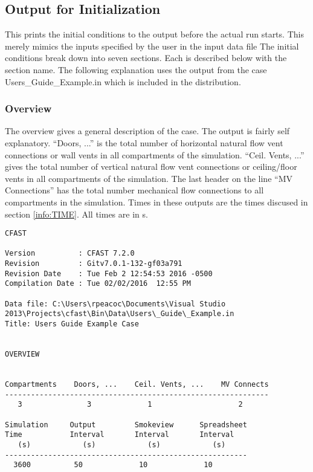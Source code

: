 \subsection{Output for Initialization}

This prints the initial conditions to the output before the actual run starts.  This merely mimics the inputs specified by the user in the input data file  The initial conditions break down into seven sections.  Each is described below with the section name. The following explanation uses the output from the case {\ct Users\_Guide\_Example.in} which is included in the distribution.

\subsubsection{Overview}

The overview gives a general description of the case.  The output is fairly self explanatory. ``Doors, ...'' is the total number of horizontal natural flow vent connections or wall vents in all compartments of the simulation.  ``Ceil. Vents, ...'' gives the total number of vertical natural flow vent connections or ceiling/floor vents in all compartments of the simulation.  The last header on the line ``MV Connections'' has the total number mechanical flow connections to all compartments in the simulation. Times in these outputs are the times discused in section \ref{info:TIME}. All times are in s.
\begin{lstlisting}[basicstyle=\tiny]
CFAST

Version          : CFAST 7.2.0
Revision         : Gitv7.0.1-132-gf03a791
Revision Date    : Tue Feb 2 12:54:53 2016 -0500
Compilation Date : Tue 02/02/2016  12:55 PM

Data file: C:\Users\rpeacoc\Documents\Visual Studio 2013\Projects\cfast\Bin\Data\Users\_Guide\_Example.in
Title: Users Guide Example Case


OVERVIEW


Compartments    Doors, ...    Ceil. Vents, ...    MV Connects
-------------------------------------------------------------
   3               3             1                    2

Simulation     Output         Smokeview      Spreadsheet
Time           Interval       Interval       Interval
   (s)            (s)            (s)            (s)
--------------------------------------------------------
  3600          50             10             10
\end{lstlisting}


